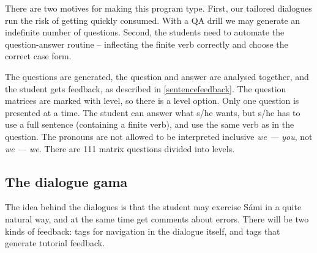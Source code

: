 \documentclass[11pt]{article}
\begin{document}
There are two motives for making this program type. First, our tailored dialogues 
run the risk of getting quickly consumed. With a QA drill we may generate an indefinite number of questions. Second, the students need to automate the question-answer routine -- inflecting the finite verb correctly and choose the correct case form.

The questions are generated, the question and answer are analysed together, and the student gets feedback, as described in \ref{sentencefeedback}. The question matrices are marked with level, so there is a level option. Only one question is presented at a time. The student can answer what s/he wants, but s/he has to use a full sentence (containing a finite verb), and use the same verb as in the question. The pronouns are not allowed to be interpreted inclusive \textit{we — you}, not \textit{we — we}. There are 111 matrix questions divided into levels.



	

\subsection{The dialogue gama}
The idea behind the dialogues is that the student may exercise Sámi in a quite natural way, and at the same time get comments about errors. There will be two kinds of feedback: tags for navigation in the dialogue itself, and tags that generate tutorial feedback.
\end{document}
